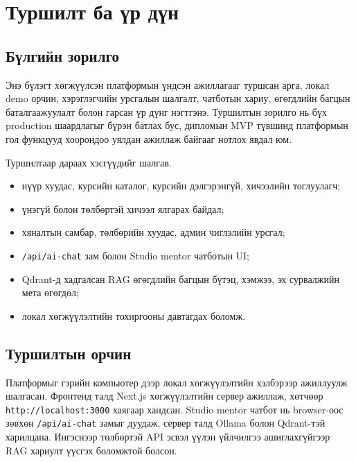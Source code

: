 
\chapter{Туршилт ба үр дүн}
\label{Chapter4}

\section{Бүлгийн зорилго}
Энэ бүлэгт хөгжүүлсэн платформын үндсэн ажиллагааг туршсан арга, локал demo орчин, хэрэглэгчийн урсгалын шалгалт, чатботын хариу, өгөгдлийн багцын баталгаажуулалт болон гарсан үр дүнг нэгтгэнэ. Туршилтын зорилго нь бүх production шаардлагыг бүрэн батлах бус, дипломын MVP түвшинд платформын гол функцууд хоорондоо уялдан ажиллаж байгааг нотлох явдал юм.

Туршилтаар дараах хэсгүүдийг шалгав.
\begin{itemize}
  \item нүүр хуудас, курсийн каталог, курсийн дэлгэрэнгүй, хичээлийн тоглуулагч;
  \item үнэгүй болон төлбөртэй хичээл ялгарах байдал;
  \item хяналтын самбар, төлбөрийн хуудас, админ чиглэлийн урсгал;
  \item \texttt{/api/ai-chat} зам болон Studio mentor чатботын UI;
  \item Qdrant-д хадгалсан RAG өгөгдлийн багцын бүтэц, хэмжээ, эх сурвалжийн мета өгөгдөл;
  \item локал хөгжүүлэлтийн тохиргооны давтагдах боломж.
\end{itemize}

\section{Туршилтын орчин}
Платформыг гэрийн компьютер дээр локал хөгжүүлэлтийн хэлбэрээр ажиллуулж шалгасан. Фронтенд талд Next.js хөгжүүлэлтийн сервер ажиллаж, хөтчөөр \texttt{http://localhost:3000} хаягаар хандсан. Studio mentor чатбот нь browser-оос зөвхөн \texttt{/api/ai-chat} замыг дуудаж, сервер талд Ollama болон Qdrant-тэй харилцана. Ингэснээр төлбөртэй API эсвэл үүлэн үйлчилгээ ашиглахгүйгээр RAG хариулт үүсгэх боломжтой болсон.

